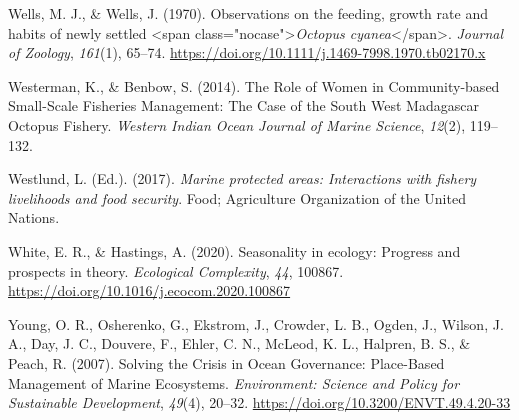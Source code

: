\documentclass[
  12pt,
]{article}
\newlength{\cslhangindent}
\newlength{\cslentryspacingunit} %
\newenvironment{CSLReferences}[2] %
 {%
  \setlength{\parindent}{0pt}
  \ifodd #1
  \let\oldpar\par
  \def\par{\hangindent=\cslhangindent\oldpar}
  \fi
  \setlength{\parskip}{#2\cslentryspacingunit}
 }%
 {}
\begin{document}
\begin{CSLReferences}{1}{2}
\leavevmode{}%
Wells, M. J., \& Wells, J. (1970). Observations on the feeding, growth rate and habits of newly settled {\textless{}}span class="nocase"{\textgreater{}}\emph{{Octopus} cyanea}{\textless{}}/span{\textgreater{}}. \emph{Journal of Zoology}, \emph{161}(1), 65--74. \url{https://doi.org/10.1111/j.1469-7998.1970.tb02170.x}

\leavevmode{}%
Westerman, K., \& Benbow, S. (2014). The {Role} of {Women} in {Community}-based {Small}-{Scale} {Fisheries} {Management}: {The} {Case} of the {South} {West} {Madagascar} {Octopus} {Fishery}. \emph{Western Indian Ocean Journal of Marine Science}, \emph{12}(2), 119--132.

\leavevmode{}%
Westlund, L. (Ed.). (2017). \emph{Marine protected areas: Interactions with fishery livelihoods and food security}. Food; Agriculture Organization of the United Nations.

\leavevmode{}%
White, E. R., \& Hastings, A. (2020). Seasonality in ecology: {Progress} and prospects in theory. \emph{Ecological Complexity}, \emph{44}, 100867. \url{https://doi.org/10.1016/j.ecocom.2020.100867}

\leavevmode{}%
Young, O. R., Osherenko, G., Ekstrom, J., Crowder, L. B., Ogden, J., Wilson, J. A., Day, J. C., Douvere, F., Ehler, C. N., McLeod, K. L., Halpren, B. S., \& Peach, R. (2007). Solving the {Crisis} in {Ocean} {Governance}: {Place}-{Based} {Management} of {Marine} {Ecosystems}. \emph{Environment: Science and Policy for Sustainable Development}, \emph{49}(4), 20--32. \url{https://doi.org/10.3200/ENVT.49.4.20-33}

\end{CSLReferences}
\end{document}
